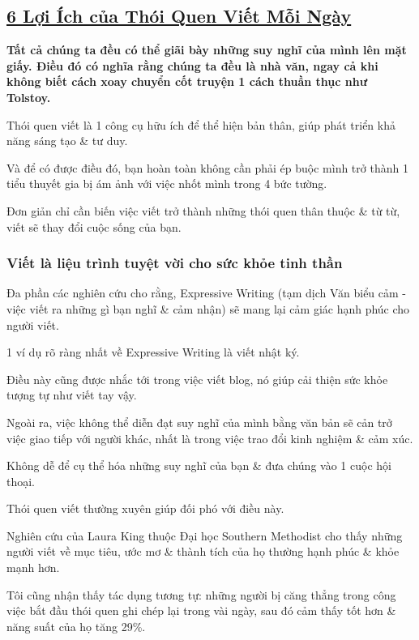\documentclass{article}
\begin{document}
\subsection{\href{http://tramdoc.vn/tin-tuc/6-loi-ich-cua-thoi-quen-viet-moi-ngay-nzG1AW.html}{6 Lợi Ích của Thói Quen Viết Mỗi Ngày}}

\textbf{Tất cả chúng ta đều có thể giãi bày những suy nghĩ của mình lên mặt giấy. Điều đó có nghĩa rằng chúng ta đều là nhà văn, ngay cả khi không biết cách xoay chuyển cốt truyện 1 cách thuần thục như Tolstoy.}

%
Thói quen viết là 1 công cụ hữu ích để thể hiện bản thân, giúp phát triển khả năng sáng tạo \& tư duy.

Và để có được điều đó, bạn hoàn toàn không cần phải ép buộc mình trở thành 1 tiểu thuyết gia bị ám ảnh với việc nhốt mình trong 4 bức tường.

Đơn giản chỉ cần biến việc viết trở thành những thói quen thân thuộc \& từ từ, viết sẽ thay đổi cuộc sống của bạn.

\subsubsection{Viết là liệu trình tuyệt vời cho sức khỏe tinh thần}
Đa phần các nghiên cứu cho rằng, Expressive Writing (tạm dịch Văn biểu cảm - việc viết ra những gì bạn nghĩ \& cảm nhận) sẽ mang lại cảm giác hạnh phúc cho người viết.

1 ví dụ rõ ràng nhất về Expressive Writing là viết nhật ký.

Điều này cũng được nhắc tới trong việc viết blog, nó giúp cải thiện sức khỏe tượng tự như viết tay vậy.

%
Ngoài ra, việc không thể diễn đạt suy nghĩ của mình bằng văn bản sẽ cản trở việc giao tiếp với người khác, nhất là trong việc trao đổi kinh nghiệm \& cảm xúc.

Không dễ để cụ thể hóa những suy nghĩ của bạn \& đưa chúng vào  1 cuộc hội thoại.

Thói quen viết thường xuyên giúp đối phó với điều này.

%
Nghiên cứu của Laura King thuộc Đại học Southern Methodist cho thấy những người viết về mục tiêu, ước mơ \& thành tích của họ thường hạnh phúc \& khỏe mạnh hơn.

Tôi cũng nhận thấy tác dụng tương tự: những người bị căng thẳng trong công việc bắt đầu thói quen ghi chép lại trong vài ngày, sau đó cảm thấy tốt hơn \& năng suất của họ tăng 29\%.
\end{document}
